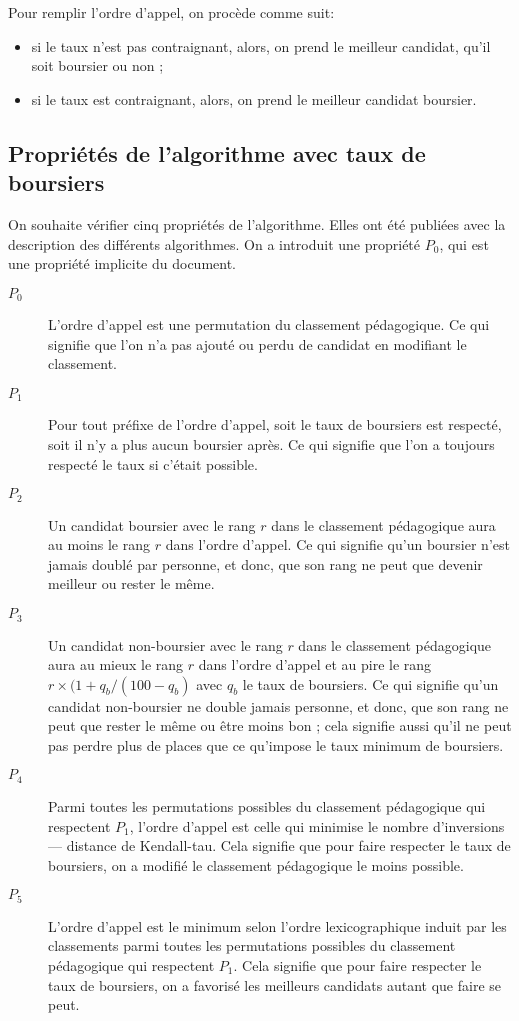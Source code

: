     Pour remplir l'ordre d'appel, on procède comme suit:

    \begin{itemize}
      \item si le taux n'est pas contraignant, alors, on prend le meilleur candidat, qu'il soit boursier ou non ;
      \item si le taux est contraignant, alors, on prend le meilleur candidat boursier.
    \end{itemize}

  \subsection{Propriétés de l'algorithme avec taux de boursiers}

    On souhaite vérifier cinq propriétés de l'algorithme. Elles ont été publiées avec la description des différents algorithmes\cite{AlgoPS}. On a introduit une propriété $P_0$, qui est une propriété implicite du document.

    \begin{description}
      \item[$P_0$] L'ordre d'appel est une permutation du classement pédagogique. Ce qui signifie que l'on n'a pas ajouté ou perdu de candidat en modifiant le classement.
      \item[$P_1$] Pour tout préfixe de l'ordre d'appel, soit le taux de boursiers est respecté, soit il n'y a plus aucun boursier après. Ce qui signifie que l'on a toujours respecté le taux si c'était possible.
      \item[$P_2$] Un candidat boursier avec le rang $r$ dans le classement pédagogique aura au moins le rang $r$ dans l'ordre d'appel. Ce qui signifie qu'un boursier n'est jamais doublé par personne, et donc, que son rang ne peut que devenir meilleur ou rester le même.
      \item[$P_3$] Un candidat non-boursier avec le rang $r$ dans le classement pédagogique aura au mieux le rang $r$ dans l'ordre d'appel et au pire le rang $r \times (1 + q_b / (100 - q_b)$ avec $q_b$ le taux de boursiers. Ce qui signifie qu'un candidat non-boursier ne double jamais personne, et donc, que son rang ne peut que rester le même ou être moins bon ; cela signifie aussi qu'il ne peut pas perdre plus de places que ce qu'impose le taux minimum de boursiers.
      \item[$P_4$] Parmi toutes les permutations possibles du classement pédagogique qui respectent $P_1$, l'ordre d'appel est celle qui minimise le nombre d'inversions --- distance de Kendall-tau. Cela signifie que pour faire respecter le taux de boursiers, on a modifié le classement pédagogique le moins possible.
      \item[$P_5$] L'ordre d'appel est le minimum selon l'ordre lexicographique induit par les classements parmi toutes les permutations possibles du classement pédagogique qui respectent $P_1$. Cela signifie que pour faire respecter le taux de boursiers, on a favorisé les meilleurs candidats autant que faire se peut.
    \end{description}
